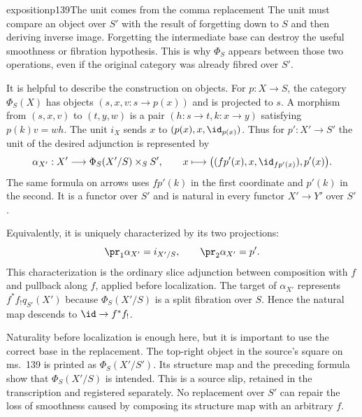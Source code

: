 \begin{dcomment}{exposition}{p139}{The unit comes from the comma replacement}
The unit must compare an object over $S'$ with the result of forgetting down to $S$ and then deriving inverse image. Forgetting the intermediate base can destroy the useful smoothness or fibration hypothesis. This is why $\Phi_S$ appears between those two operations, even if the original category was already fibred over $S'$.

It is helpful to describe the construction on objects. For $p:X\to S$, the category $\Phi_S(X)$ has objects $(s,x,v:s\to p(x))$ and is projected to $s$. A morphism from $(s,x,v)$ to $(t,y,w)$ is a pair $(h:s\to t,k:x\to y)$ satisfying $p(k)v=wh$. The unit $i_X$ sends $x$ to $(p(x),x,\id_{p(x)})$. Thus for $p':X'\to S'$ the unit of the desired adjunction is represented by
\[
 \alpha_{X'}:X'\longrightarrow\Phi_S(X'/S)\times_S S',
 \qquad x\longmapsto
 \bigl((f p'(x),x,\id_{f p'(x)}),p'(x)\bigr).
\]
The same formula on arrows uses $f p'(k)$ in the first coordinate and $p'(k)$ in the second. It is a functor over $S'$ and is natural in every functor $X'\to Y'$ over $S'$.

Equivalently, it is uniquely characterized by its two projections:
\[
 \pr_1\alpha_{X'}=i_{X'/S},
 \qquad \pr_2\alpha_{X'}=p'.
\]
This characterization is the ordinary slice adjunction between composition with $f$ and pullback along $f$, applied before localization. The target of $\alpha_{X'}$ represents $f^*f_!q_{S'}(X')$ because $\Phi_S(X'/S)$ is a split fibration over $S$. Hence the natural map descends to $\id\to f^*f_!$.

Naturality before localization is enough here, but it is important to use the correct base in the replacement. The top-right object in the source's square on ms.~139 is printed as $\Phi_S(X'/S')$. Its structure map and the preceding formula show that $\Phi_S(X'/S)$ is intended. This is a source slip, retained in the transcription and registered separately. No replacement over $S'$ can repair the loss of smoothness caused by composing its structure map with an arbitrary $f$.
\end{dcomment}

